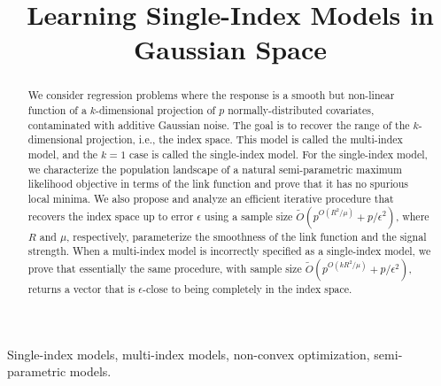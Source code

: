 \documentclass[final,12pt]{colt2018} %
\title[Learning Single-index Models]{Learning Single-Index Models in Gaussian Space}
\begin{document}
\maketitle

\begin{abstract}
We consider regression problems where the response is a smooth but non-linear function of a $k$-dimensional projection of $p$ normally-distributed covariates, contaminated with additive Gaussian noise. The goal is to recover the range of the $k$-dimensional projection, i.e., the index space. This model is called the multi-index model, and the $k=1$ case is called the single-index model. For the single-index model, we characterize the population landscape of a natural semi-parametric maximum likelihood objective in terms of the link function and prove that it has no spurious local minima. We also propose and analyze an efficient iterative procedure that recovers the index space up to error $\epsilon$ using a sample size $\tilde{O}(p^{O(R^2/\mu)} + p/\epsilon^2)$, where $R$ and $\mu$, respectively, parameterize the smoothness of the link function and the signal strength. When a multi-index model is incorrectly specified as a single-index model, we prove that essentially the same procedure, with sample size $\tilde{O}(p^{O(kR^2/\mu)} + p/\epsilon^2)$, returns a vector that is $\epsilon$-close to being completely in the index space.
\end{abstract}

\begin{keywords}
Single-index models, multi-index models, non-convex optimization, semi-parametric models.
\end{keywords}
\end{document}
